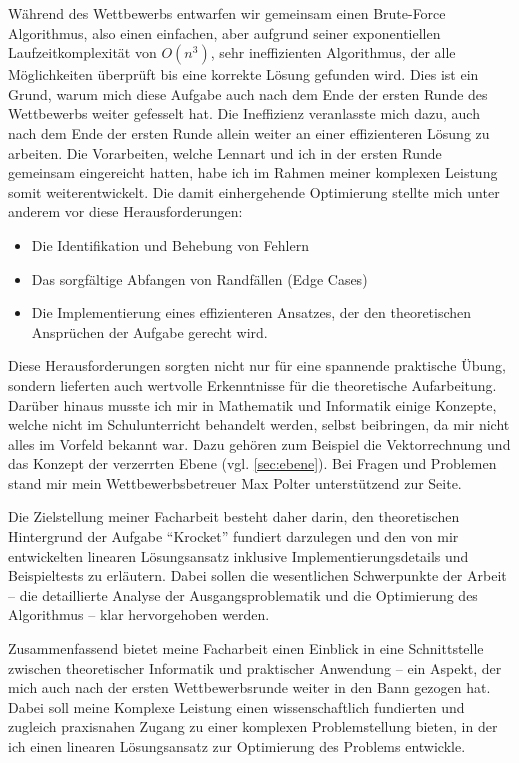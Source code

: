 Während des Wettbewerbs entwarfen wir gemeinsam einen Brute-Force Algorithmus, also einen einfachen, aber aufgrund seiner exponentiellen Laufzeitkomplexität von $O(n^3)$, sehr ineffizienten Algorithmus, der alle Möglichkeiten überprüft bis eine korrekte Lösung gefunden wird. Dies ist ein Grund, warum mich diese Aufgabe auch nach dem Ende der ersten Runde des Wettbewerbs weiter gefesselt hat. Die Ineffizienz veranlasste mich dazu, auch nach dem Ende der ersten Runde allein weiter an einer effizienteren Lösung zu arbeiten. Die Vorarbeiten, welche Lennart und ich in der ersten Runde gemeinsam eingereicht hatten, habe ich im Rahmen meiner komplexen Leistung somit weiterentwickelt. Die damit einhergehende Optimierung stellte mich unter anderem vor diese Herausforderungen:
\begin{itemize}
	\item Die Identifikation und Behebung von Fehlern
	\item Das sorgfältige Abfangen von Randfällen (Edge Cases)
	\item Die Implementierung eines effizienteren Ansatzes, der den theoretischen Ansprüchen der Aufgabe gerecht wird.
\end{itemize}

Diese Herausforderungen sorgten nicht nur für eine spannende praktische Übung, sondern lieferten auch wertvolle Erkenntnisse für die theoretische Aufarbeitung. Darüber hinaus musste ich mir in Mathematik und Informatik einige Konzepte, welche nicht im Schulunterricht behandelt werden, selbst beibringen, da mir nicht alles im Vorfeld bekannt war. Dazu gehören zum Beispiel die Vektorrechnung und das Konzept der verzerrten Ebene (vgl. \ref{sec:ebene}). Bei Fragen und Problemen stand mir mein Wettbewerbsbetreuer Max Polter unterstützend zur Seite.

Die Zielstellung meiner Facharbeit besteht daher darin, den theoretischen Hintergrund der Aufgabe \enquote{Krocket} fundiert darzulegen und den von mir entwickelten linearen Lösungsansatz inklusive Implementierungsdetails und Beispieltests zu erläutern. Dabei sollen die wesentlichen Schwerpunkte der Arbeit – die detaillierte Analyse der Ausgangsproblematik und die Optimierung des Algorithmus – klar hervorgehoben werden.

Zusammenfassend bietet meine Facharbeit einen Einblick in eine Schnittstelle zwischen theoretischer Informatik und praktischer Anwendung – ein Aspekt, der mich auch nach der ersten Wettbewerbsrunde weiter in den Bann gezogen hat. Dabei soll meine Komplexe Leistung einen wissenschaftlich fundierten und zugleich praxisnahen Zugang zu einer komplexen Problemstellung bieten, in der ich einen linearen Lösungsansatz zur Optimierung des Problems entwickle.

